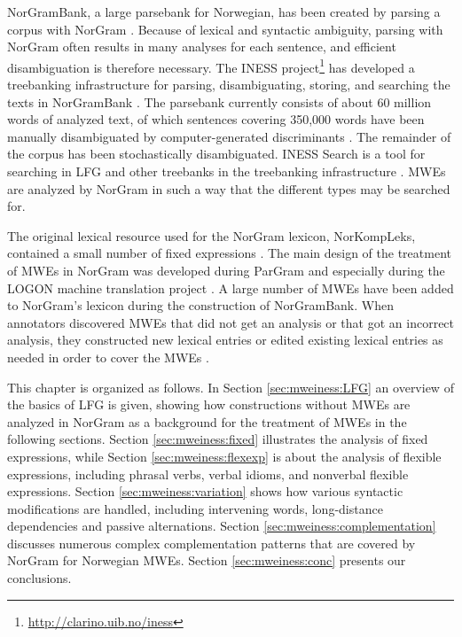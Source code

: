 \documentclass[output=paper]{langsci/langscibook}
\begin{document}
NorGramBank, a large parsebank for Norwegian, has been created by parsing a corpus with NorGram \citep{dyvik16}.
Because of lexical and syntactic ambiguity, parsing with NorGram often results in many analyses for each sentence, and efficient disambiguation is therefore necessary.
The INESS project\footnote{\url{http://clarino.uib.no/iness}} has developed a treebanking infrastructure for parsing, disambiguating, storing, and searching the texts in NorGramBank \citep{rosen12lrec}.
The parsebank currently consists of about 60 million words of analyzed text, of which sentences covering 350,000 words have been manually disambiguated by computer-generated discriminants \citep{rosen07lfg}.
The remainder of the corpus has been stochastically disambiguated.
INESS Search is a tool for searching in LFG and other treebanks in the treebanking infrastructure \citep{meurer12}.
MWEs are analyzed by NorGram in such a way that the different types may be searched for.

The original lexical resource used for the NorGram lexicon, NorKompLeks, contained a small number of fixed expressions \citep{nordgard00}.
The main design of the treatment of MWEs in NorGram was developed during ParGram \citep{pargram02} and especially during the LOGON machine translation project \citep{lonning04}.
A large number of MWEs have been added to NorGram’s lexicon during the construction of NorGramBank.
When annotators discovered MWEs that did not get an analysis or that got an incorrect analysis, they constructed new lexical entries or edited existing lexical entries as needed in order to cover the MWEs \citep{losnegaard12,rosen16lre}.

This chapter is organized as follows.
In Section \ref{sec:mweiness:LFG} an overview of the basics of LFG is given, showing how constructions without MWEs are analyzed in NorGram as a background for the treatment of MWEs in the following sections.
Section \ref{sec:mweiness:fixed} illustrates the analysis of fixed expressions, while Section \ref{sec:mweiness:flexexp} is about the analysis of flexible expressions, including phrasal verbs, verbal idioms, and nonverbal flexible expressions.
Section \ref{sec:mweiness:variation} shows how various syntactic modifications are handled, including intervening words, long-distance dependencies and passive alternations.
Section \ref{sec:mweiness:complementation} discusses numerous complex complementation patterns that are covered by NorGram for Norwegian MWEs.
Section \ref{sec:mweiness:conc} presents our conclusions.
\end{document}
